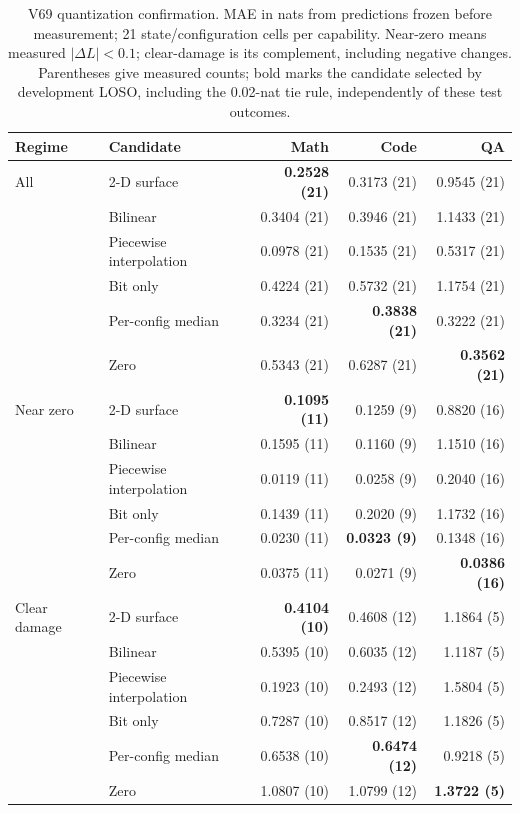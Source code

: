 \begin{table}[tb]
\centering
\small
\caption{V69 quantization confirmation. MAE in nats from predictions frozen before measurement; 21 state/configuration cells per capability. Near-zero means measured $|\Delta L|<0.1$; clear-damage is its complement, including negative changes. Parentheses give measured counts; bold marks the candidate selected by development LOSO, including the 0.02-nat tie rule, independently of these test outcomes.}
\label{tab:quant_confirm}
\begin{tabular}{@{}llrrr@{}}
\toprule
Regime & Candidate & Math & Code & QA \\
\midrule
All & 2-D surface & \textbf{0.2528 (21)} & 0.3173 (21) & 0.9545 (21) \\
 & Bilinear & 0.3404 (21) & 0.3946 (21) & 1.1433 (21) \\
 & Piecewise interpolation & 0.0978 (21) & 0.1535 (21) & 0.5317 (21) \\
 & Bit only & 0.4224 (21) & 0.5732 (21) & 1.1754 (21) \\
 & Per-config median & 0.3234 (21) & \textbf{0.3838 (21)} & 0.3222 (21) \\
 & Zero & 0.5343 (21) & 0.6287 (21) & \textbf{0.3562 (21)} \\
\addlinespace
Near zero & 2-D surface & \textbf{0.1095 (11)} & 0.1259 (9) & 0.8820 (16) \\
 & Bilinear & 0.1595 (11) & 0.1160 (9) & 1.1510 (16) \\
 & Piecewise interpolation & 0.0119 (11) & 0.0258 (9) & 0.2040 (16) \\
 & Bit only & 0.1439 (11) & 0.2020 (9) & 1.1732 (16) \\
 & Per-config median & 0.0230 (11) & \textbf{0.0323 (9)} & 0.1348 (16) \\
 & Zero & 0.0375 (11) & 0.0271 (9) & \textbf{0.0386 (16)} \\
\addlinespace
Clear damage & 2-D surface & \textbf{0.4104 (10)} & 0.4608 (12) & 1.1864 (5) \\
 & Bilinear & 0.5395 (10) & 0.6035 (12) & 1.1187 (5) \\
 & Piecewise interpolation & 0.1923 (10) & 0.2493 (12) & 1.5804 (5) \\
 & Bit only & 0.7287 (10) & 0.8517 (12) & 1.1826 (5) \\
 & Per-config median & 0.6538 (10) & \textbf{0.6474 (12)} & 0.9218 (5) \\
 & Zero & 1.0807 (10) & 1.0799 (12) & \textbf{1.3722 (5)} \\
\bottomrule
\end{tabular}
\end{table}
